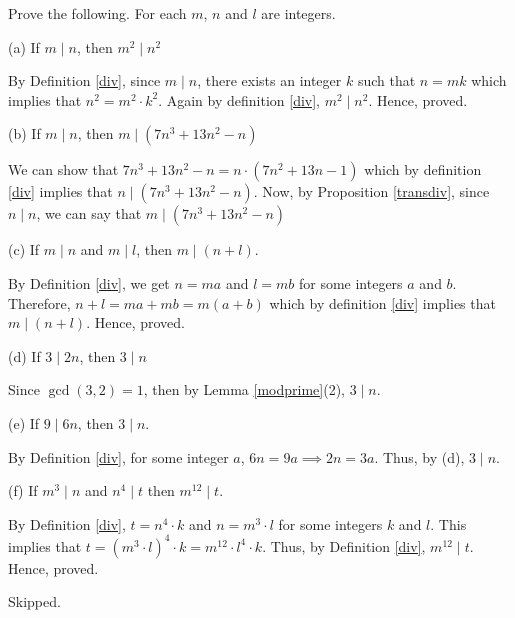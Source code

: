 \begin{problem}
	Prove the following. For each $m$, $n$ and $l$ are integers.

	(a) If $m \mid n$, then $m^2 \mid n^2$
	\begin{solution}
		By Definition \ref{div}, since $m \mid n$, there exists an integer $k$ such that $n = mk$ which implies that $n^2 = m^2 \cdot k^2$.
		Again by definition \ref{div}, $m^2 \mid n^2$. 
		Hence, proved.
	\end{solution}

	(b) If $m \mid n$, then $m \mid (7n^3 + 13n^2 - n)$
	\begin{solution}
		We can show that $7n^3 + 13n^2 - n = n \cdot (7n^2 + 13n - 1)$ which by definition \ref{div} implies that $n \mid (7n^3 + 13n^2 - n)$.
		Now, by Proposition \ref{transdiv}, since $n \mid n$, we can say that $m \mid (7n^3 + 13n^2 - n)$
	\end{solution}

	(c) If $m \mid n$ and $m \mid l$, then $m \mid (n+l)$.
	\begin{solution}
		By Definition \ref{div}, we get $n = ma$ and $l = mb$ for some integers $a$ and $b$.
		Therefore, $n+l = ma + mb = m(a+b)$ which by definition \ref{div} implies that $m \mid (n+l)$. 
		Hence, proved.
	\end{solution}

	(d) If $3 \mid 2n$, then $3 \mid n$
	\begin{solution}
		Since $\gcd(3,2) = 1$, then by Lemma \ref{modprime}(2), $3 \mid n$.
	\end{solution}

	(e) If $9 \mid 6n$, then $3 \mid n$.
	\begin{solution}
		By Definition \ref{div}, for some integer $a$, $6n = 9a \implies 2n = 3a$. Thus, by (d), $3 \mid n$.
	\end{solution}

	(f) If $m^3 \mid n$ and $n^4 \mid t$ then $m^12 \mid t$.
	\begin{solution}
		By Definition \ref{div}, $t = n^4 \cdot k$ and $n = m^3 \cdot l$ for some integers $k$ and $l$. This implies that $t = (m^3 \cdot l)^4 \cdot k = m^12  \cdot l^4 \cdot k$. Thus, by Definition \ref{div}, $m^12 \mid t$. Hence, proved.
	\end{solution}

\end{problem}


\begin{problem}Skipped.\end{problem}

